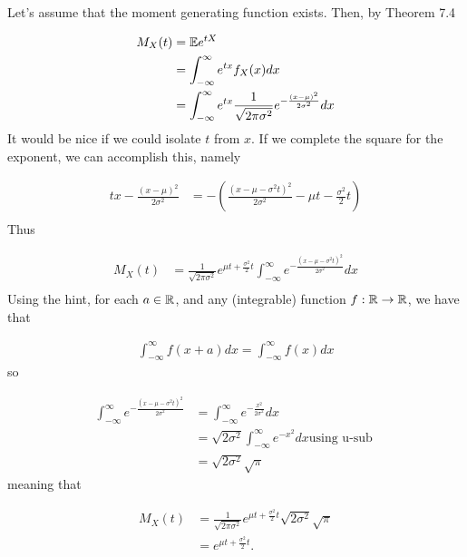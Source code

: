 
Let's assume that the moment generating function exists. Then, by Theorem 7.4

\begin{align*}
    M_{X} (t) &= \mathbb{E} e^{tX} \\
	      &= \int_{-\infty}^{\infty} e^{tx} f_{X} (x) dx\\
	      &= \int_{-\infty}^{\infty} e^{tx } \frac{1}{\sqrt{2\pi \sigma^2}} e^{-
	  \frac{(x-\mu)^2}{2\sigma^2}} dx \\ 
\end{align*}
It would be nice if we could isolate $ t$ from $ x$. If we complete the square for the exponent, we
can accomplish this, namely

\begin{align*}
    tx - \frac{(x- \mu)^2}{2 \sigma ^2} &= -\left( \frac{(x- \mu - \sigma^2 t)^2}{2 \sigma^2}  - \mu
	t - \frac{\sigma^2}{2} t \right)\\
\end{align*}
Thus

\begin{align*}
    M_{X} (t) &= \frac{1}{\sqrt{2\pi \sigma^2}}	e^{\mu t + \frac{\sigma^2}{2} t}
    \int_{-\infty}^{\infty} e^{- \frac{(x-\mu -\sigma^2 t)^2 }{2\sigma^2} } dx \\
\end{align*}
Using the hint, for each $ a \in \mathbb{R}$, and any (integrable) function $ f:\mathbb{R} \to \mathbb{R}$, we have that 

\begin{align*}
    \int_{-\infty}^{\infty} f(x+a) dx = \int_{-\infty}^{\infty} f(x)dx
\end{align*}
so 

\begin{align*}
\int_{-\infty}^{\infty} e^{ - \frac{(x-\mu - \sigma^2 t)^2}{2 \sigma^2} } &=  \int_{-\infty}^{\infty} e^{- \frac{x^2}{2\sigma^2}} dx\\
    &= \sqrt{2 \sigma^2} \int_{-\infty}^{\infty} e^{-x^2} dx \mbox{using u-sub } \\
    &= \sqrt{2\sigma^2} \sqrt{\pi}
\end{align*}
meaning that 

\begin{align*}
    M_{X} (t) &= \frac{1}{\sqrt{2 \pi \sigma^2}} e^{\mu t + \frac{\sigma^2}{2} t} \sqrt{2 \sigma^2}\sqrt{\pi}\\
	      &= e^{\mu t + \frac{\sigma^2}{2} t}. 
\end{align*}
